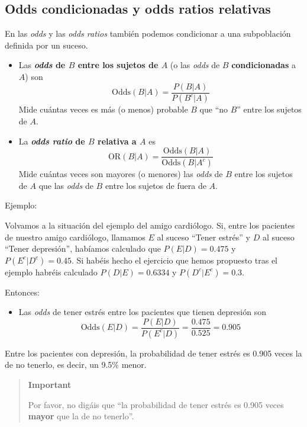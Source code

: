 \documentclass[
  spanish,
  letterpaper,
  DIV=11,
  numbers=noendperiod]{scrreprt}
\providecommand{\tightlist}{%
  \setlength{\itemsep}{0pt}\setlength{\parskip}{0pt}}
\begin{document}
\begin{tcolorbox}
\subsection{Odds condicionadas y odds ratios
relativas}\label{odds-condicionadas-y-odds-ratios-relativas}

En las \emph{odds} y las \emph{odds ratios} también podemos condicionar
a una subpoblación definida por un suceso.

\begin{itemize}
\item
  Las \textbf{\emph{odds} de \(B\) entre los sujetos de \(A\)} (o las
  \emph{odds} de \(B\) \textbf{condicionadas} a \(A\)) son \[
  \text{Odds}(B|A)=\frac{P(B|A)}{P(B^c|A)}
  \] Mide cuántas veces es más (o menos) probable \(B\) que ``no \(B\)''
  entre los sujetos de \(A\).
\item
  La \textbf{\emph{odds ratio} de \(B\) relativa a \(A\)} es \[
  \text{OR}(B|A)=\frac{\text{Odds}(B|A)}{\text{Odds}(B|A^c)}
  \] Mide cuántas veces son mayores (o menores) las \emph{odds} de \(B\)
  entre los sujetos de \(A\) que las \emph{odds} de \(B\) entre los
  sujetos de fuera de \(A\).
\end{itemize}

Ejemplo:

Volvamos a la situación del ejemplo del amigo cardiólogo. Si, entre los
pacientes de nuestro amigo cardiólogo, llamamos \(E\) al suceso ``Tener
estrés'' y \(D\) al suceso ``Tener depresión'', habíamos calculado que
\(P(E|D)=0.475\) y \(P(E^c|D^c)=0.45\). Si habéis hecho el ejercicio que
hemos propuesto tras el ejemplo habréis calculado \(P(D|E)=0.6334\) y
\(P(D^c|E^c)=0.3\).

Entonces:

\begin{itemize}
\tightlist
\item
  Las \emph{odds} de tener estrés entre los pacientes que tienen
  depresión son \[
  \text{Odds}(E|D)=\frac{P(E|D)}{P(E^c|D)}=\frac{0.475}{0.525}=0.905
  \]
\end{itemize}

Entre los pacientes con depresión, la probabilidad de tener estrés es
0.905 veces la de no tenerlo, es decir, un 9.5\% menor.

\begin{quote}
\textbf{Important}

Por favor, no digáis que ``la probabilidad de tener estrés es 0.905
veces \textbf{mayor} que la de no tenerlo''.
\end{quote}


\end{tcolorbox}
\end{document}
